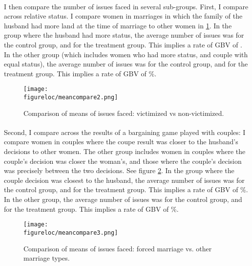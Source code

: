 \documentclass[11pt,a4paper]{scrartcl} %
\newcommand{\figureloc}{C:/Users/Koen/Dropbox/PhD/Papers/CongoGBV/Figures}
\begin{document}
\paragraph{}
I then compare the number of issues faced in several sub-groups. First, I compare across relative status. I compare women in marriages in which the family of the husband had more land at the time of marriage to other women in \ref{fig:meancompare2}. In the group where the husband had more status, the average number of issues was  for the control group, and  for the treatment group. This implies a rate of GBV of . In the other group (which includes women who had more status, and couple with equal status), the average number of issues was  for the control group, and  for the treatment group. This implies a rate of GBV of \%. 

\begin{figure}
  \texttt{[image: \\figureloc/meancompare2.png]}
  \caption{Comparison of means of issues faced: victimized vs non-victimized.}
  \label{fig:meancompare2}
\end{figure}

\paragraph{}
Second, I compare across the results of a bargaining game played with couples: I compare women in couples where the coupe result was closer to the husband's decisions to other women. The other group includes women in couples where the couple's decision was closer the woman's, and those where the couple's decision was precisely between the two decisions. See figure \ref{fig:meancompare3}. In the group where the couple decision was closest to the husband, the average number of issues was  for the control group, and  for the treatment group. This implies a rate of GBV of \%. In the other group, the average number of issues was  for the control group, and  for the treatment group. This implies a rate of GBV of \%. 

\begin{figure}
  \texttt{[image: \\figureloc/meancompare3.png]}
  \caption{Comparison of means of issues faced: forced marriage vs. other marriage types.}
  \label{fig:meancompare3}
\end{figure}
\end{document}
